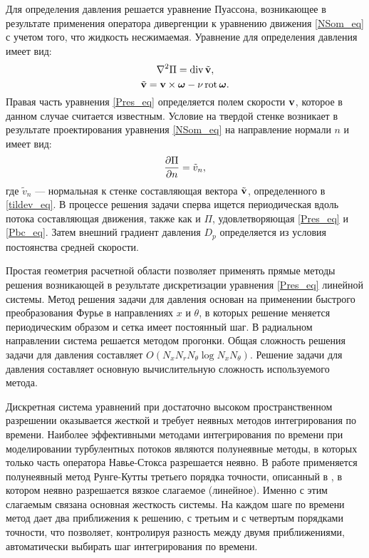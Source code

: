 Для определения давления решается уравнение Пуассона, возникающее в результате применения оператора дивергенции к уравнению движения \eqref{NSom_eq} с учетом того, что жидкость несжимаемая. Уравнение для определения давления имеет вид:
\begin{equation}\label{Pres_eq}
\nabla^2 \Pi = \mathop{}\!\operatorname{div} \tilde {\mathbf{v}},
\end{equation}
\begin{equation}\label{tildev_eq}
\tilde {\mathbf{v}} =  \mathbf{v} \times \mbox{\boldmath$\omega$} - \nu \mathop{}\!\operatorname{rot} \mbox{\boldmath$\omega$}.
\end{equation}
Правая часть уравнения \eqref{Pres_eq} определяется полем скорости $\mathbf{v}$, которое в данном случае считается известным. Условие на твердой стенке возникает в результате проектирования уравнения \eqref{NSom_eq} на направление нормали $n$ и имеет вид:
\begin{equation}\label{Pbc_eq}
\frac{\partial \Pi}{\partial n} = \tilde v_n,
\end{equation}
где $\tilde v_n$ --- нормальная к стенке составляющая вектора $\tilde{\mathbf{v}}$, определенного в \eqref{tildev_eq}. В процессе решения задачи сперва ищется периодическая вдоль потока составляющая движения, также как и $\Pi$, удовлетворяющая \eqref{Pres_eq} и \eqref{Pbc_eq}. Затем внешний градиент давления $D_p$ определяется из условия постоянства средней скорости. 


Простая геометрия расчетной области позволяет применять прямые методы решения возникающей в результате дискретизации уравнения \eqref{Pres_eq} линейной системы. Метод решения задачи для давления основан на применении быстрого преобразования Фурье в направлениях $x$ и $\theta$, в которых решение меняется периодическим образом и сетка имеет постоянный шаг. В радиальном направлении система решается методом прогонки. Общая сложность решения задачи для давления составляет $O(N_x N_r N_\theta \log N_x N_\theta)$. Решение задачи для давления составляет основную вычислительную сложность используемого метода. 

Дискретная система уравнений при достаточно высоком пространственном разрешении оказывается жесткой и требует неявных методов интегрирования по времени. Наиболее эффективными методами интегрирования по времени при моделировании турбулентных потоков являются полунеявные методы, в которых только часть оператора Навье-Стокса разрешается неявно. В работе применяется полунеявный метод Рунге-Кутты третьего порядка точности, описанный в \cite{Nikitin2006third}, в котором неявно разрешается вязкое слагаемое (линейное). Именно с этим слагаемым связана основная жесткость системы. На каждом шаге по времени метод дает два приближения к решению, с третьим и с четвертым порядками точности, что позволяет, контролируя разность между двумя приближениями, автоматически выбирать шаг интегрирования по времени. 


